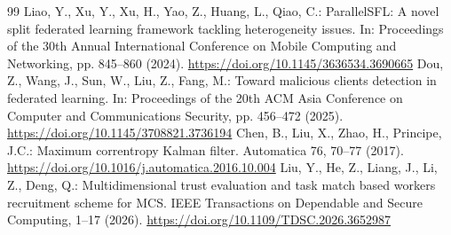 \documentclass[10pt,a4paper,UTF8,fontset=fandol]{ctexart}
\begin{document}
\begin{thebibliography}{99}
     Liao, Y., Xu, Y., Xu, H., Yao, Z., Huang, L., Qiao, C.: ParallelSFL: A novel split federated learning framework tackling heterogeneity issues. In: Proceedings of the 30th Annual International Conference on Mobile Computing and Networking, pp. 845--860 (2024). \url{https://doi.org/10.1145/3636534.3690665}
     Dou, Z., Wang, J., Sun, W., Liu, Z., Fang, M.: Toward malicious clients detection in federated learning. In: Proceedings of the 20th ACM Asia Conference on Computer and Communications Security, pp. 456--472 (2025). \url{https://doi.org/10.1145/3708821.3736194}
     Chen, B., Liu, X., Zhao, H., Principe, J.C.: Maximum correntropy Kalman filter. Automatica 76, 70--77 (2017). \url{https://doi.org/10.1016/j.automatica.2016.10.004}
     Liu, Y., He, Z., Liang, J., Li, Z., Deng, Q.: Multidimensional trust evaluation and task match based workers recruitment scheme for MCS. IEEE Transactions on Dependable and Secure Computing, 1--17 (2026). \url{https://doi.org/10.1109/TDSC.2026.3652987}

\end{thebibliography}
\endgroup
\end{document}
